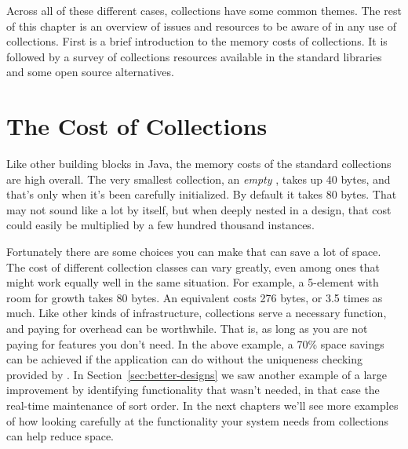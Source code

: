 Across all of these different cases, collections have some common themes.
The rest of this chapter is an overview of issues and resources to be aware of
in any use of collections. First is a brief
introduction to the memory costs of collections. It is followed by a
survey of collections resources available in the
standard libraries and some open source alternatives.

\section{The Cost of Collections}
\label{sec:designing-with-collections}

Like other building blocks in Java, the memory costs
of the standard collections are high overall. 
The very smallest collection, an \emph{empty}
, takes up 40 bytes, and that's only when it's been carefully
initialized. By default it takes 80 bytes. That may not sound like a lot by
itself, but when deeply nested in a design, that cost could easily be multiplied
by a few hundred thousand instances.  







Fortunately there are some choices you can make that
can save a lot of space. The cost of different
collection classes can vary greatly, even among ones that might work equally well in the same situation. For example,
a 5-element  with room for growth takes 80 bytes. An equivalent  costs 276 bytes,
or 3.5 times as much. Like other kinds of infrastructure, collections serve a
necessary function, and paying for overhead can be worthwhile. That is, as long as you are not
paying for features you don't need. In the above example, a
70\% space savings can be achieved if the application can do without the
uniqueness checking provided by .  In Section~\ref{sec:better-designs} we saw another example
of a large improvement by identifying functionality that wasn't needed, in that
case the real-time maintenance of sort order. In the next chapters we'll see
more examples of how looking carefully at the functionality your system needs from collections can help reduce space.

